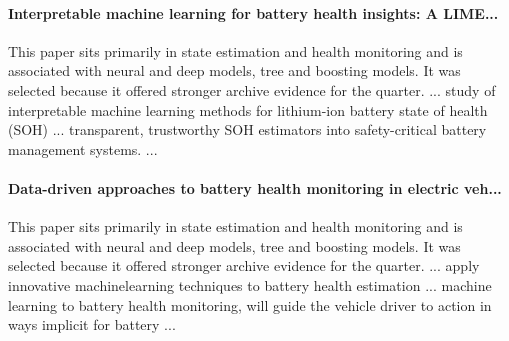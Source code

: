 \documentclass[conference]{IEEEtran}
\begin{document}
\paragraph{Interpretable machine learning for battery health insights: A LIME...} This paper sits primarily in state estimation and health monitoring and is associated with neural and deep models, tree and boosting models. It was selected because it offered stronger archive evidence for the quarter. ... study of interpretable machine learning methods for lithium-ion battery state of health (SOH) ... transparent, trustworthy SOH estimators into safety-critical battery management systems. ... \cite{interpretablemachinelear2025}

\paragraph{Data-driven approaches to battery health monitoring in electric veh...} This paper sits primarily in state estimation and health monitoring and is associated with neural and deep models, tree and boosting models. It was selected because it offered stronger archive evidence for the quarter. ... apply innovative machinelearning techniques to battery health estimation ... machine learning to battery health monitoring, will guide the vehicle driver to action in ways implicit for battery ... \cite{datadrivenapproaches2024}
\end{document}
